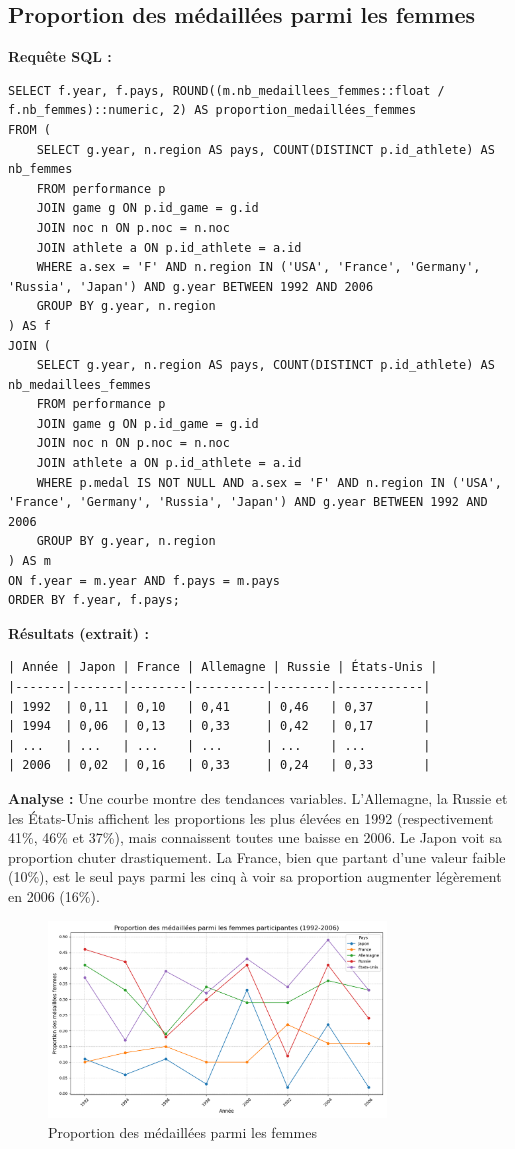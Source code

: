 \documentclass[fontsize=10pt,oneside]{scrreprt}
\begin{document}
\subsection{Proportion des médaillées parmi les femmes}
\textbf{Requête SQL :}
\begin{verbatim}
SELECT f.year, f.pays, ROUND((m.nb_medaillees_femmes::float / f.nb_femmes)::numeric, 2) AS proportion_medaillées_femmes
FROM (
    SELECT g.year, n.region AS pays, COUNT(DISTINCT p.id_athlete) AS nb_femmes
    FROM performance p
    JOIN game g ON p.id_game = g.id
    JOIN noc n ON p.noc = n.noc
    JOIN athlete a ON p.id_athlete = a.id
    WHERE a.sex = 'F' AND n.region IN ('USA', 'France', 'Germany', 'Russia', 'Japan') AND g.year BETWEEN 1992 AND 2006
    GROUP BY g.year, n.region
) AS f
JOIN (
    SELECT g.year, n.region AS pays, COUNT(DISTINCT p.id_athlete) AS nb_medaillees_femmes
    FROM performance p
    JOIN game g ON p.id_game = g.id
    JOIN noc n ON p.noc = n.noc
    JOIN athlete a ON p.id_athlete = a.id
    WHERE p.medal IS NOT NULL AND a.sex = 'F' AND n.region IN ('USA', 'France', 'Germany', 'Russia', 'Japan') AND g.year BETWEEN 1992 AND 2006
    GROUP BY g.year, n.region
) AS m
ON f.year = m.year AND f.pays = m.pays
ORDER BY f.year, f.pays;
\end{verbatim}
\textbf{Résultats (extrait) :}
\begin{verbatim}
| Année | Japon | France | Allemagne | Russie | États-Unis |
|-------|-------|--------|----------|--------|------------|
| 1992  | 0,11  | 0,10   | 0,41     | 0,46   | 0,37       |
| 1994  | 0,06  | 0,13   | 0,33     | 0,42   | 0,17       |
| ...   | ...   | ...    | ...      | ...    | ...        |
| 2006  | 0,02  | 0,16   | 0,33     | 0,24   | 0,33       |
\end{verbatim}
\textbf{Analyse :} Une courbe montre des tendances variables. L'Allemagne, la Russie et les États-Unis affichent les proportions les plus élevées en 1992 (respectivement 41\%, 46\% et 37\%), mais connaissent toutes une baisse en 2006. Le Japon voit sa proportion chuter drastiquement. La France, bien que partant d'une valeur faible (10\%), est le seul pays parmi les cinq à voir sa proportion augmenter légèrement en 2006 (16\%).
\begin{figure}[H]
    \centering
    \includegraphics[width=0.8\textwidth]{charts/3bv.png}
    \caption{Proportion des médaillées parmi les femmes}
    \label{fig:prop_medaillees_femmes}
\end{figure}
\end{document}
